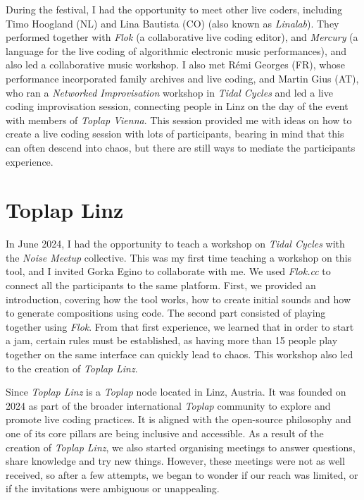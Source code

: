 \documentclass[12pt, twoside, a4paper]{report}
\begin{document}
During the festival, I had the opportunity to meet other live coders, including Timo Hoogland (NL) and Lina Bautista (CO) (also known as \textit{Linalab}). They performed together with \textit{Flok} (a collaborative live coding editor), and \textit{Mercury} (a language for the live coding of algorithmic electronic music performances), and also led a collaborative music workshop. I also met Rémi Georges (FR), whose performance incorporated family archives and live coding, and Martin Gius (AT), who ran a \textit{Networked Improvisation} workshop in \textit{Tidal Cycles} and led a live coding improvisation session, connecting people in Linz on the day of the event with members of \textit{Toplap Vienna}. This session provided me with ideas on how to create a live coding session with lots of participants, bearing in mind that this can often descend into chaos, but there are still ways to mediate the participants experience.

\section{Toplap Linz}

In June 2024, I had the opportunity to teach a workshop on \textit{Tidal Cycles} with the \textit{Noise Meetup} collective. 
This was my first time teaching a workshop on this tool, and I invited Gorka Egino to collaborate with me. 
We used \textit{Flok.cc} to connect all the participants to the same platform. First, we provided an introduction, covering how the tool works, how to create initial sounds and how to generate compositions using code. The second part consisted of playing together using \textit{Flok}. From that first experience, we learned that in order to start a jam, certain rules must
 be established, as having more than 15 people play together on the same interface 
 can quickly lead to chaos. This workshop also led to the creation of \textit{Toplap Linz}.

Since \textit{Toplap Linz} is a \textit{Toplap} node located in Linz, Austria. It was founded on 2024 as part of the broader international \textit{Toplap} community to explore and promote live coding practices. It is aligned with the open-source philosophy and one of its core pillars are being inclusive and accessible. As a result of the creation of \textit{Toplap Linz}, we also started organising meetings to answer questions, share knowledge and try new things. However, these meetings were not as well received, so after a few attempts, we began to wonder if our reach was limited, or if the invitations were ambiguous or unappealing.
\end{document}
